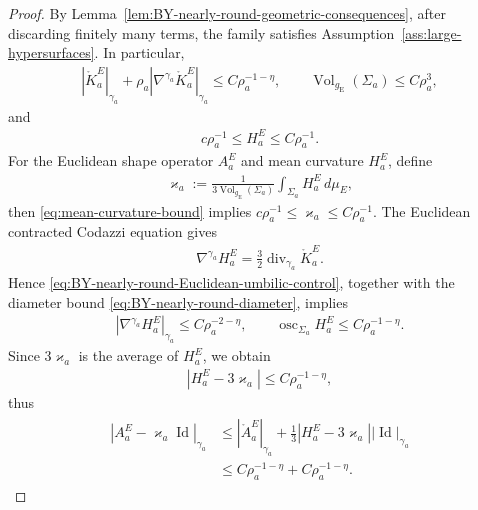 \documentclass[10pt,a4paper]{amsart}
\newcommand{\gE}{g_{\mathrm{E}}}
\newcommand{\Vol}{\operatorname{Vol}}
\newcommand{\Id}{\operatorname{Id}}
\begin{document}
	
	\begin{proof}
		By Lemma~\ref{lem:BY-nearly-round-geometric-consequences}, after
		discarding finitely many terms, the family satisfies Assumption~\ref{ass:large-hypersurfaces}. In particular,
		\begin{align}
			\label{eq:BY-nearly-round-Euclidean-umbilic-control}
			\left|\mathring K_a^E\right|_{\gamma_a}
			+
			\rho_a
			\left|\nabla^{\gamma_a}\mathring K_a^E\right|_{\gamma_a}
			\leq
			C\rho_a^{-1-\eta},
			\qquad
			\Vol_{\gE}(\Sigma_a)\leq C\rho_a^3,
		\end{align}
		and
		\begin{align}
			c\rho_a^{-1}\leq H_a^E\leq C\rho_a^{-1}.
		\end{align}
		For the Euclidean shape operator $A_a^E$ and mean curvature $H^E_a$, define
		\begin{align*}
			\varkappa_a
			:=
			\frac{1}{3\Vol_{\gE}(\Sigma_a)}
			\int_{\Sigma_a}H_a^E\,d\mu_E,
		\end{align*}
		then \eqref{eq:mean-curvature-bound} implies $c\rho_a^{-1}\leq \varkappa_a\leq C\rho_a^{-1}$. The Euclidean contracted Codazzi equation gives
		\begin{align*}
			\nabla^{\gamma_a}H_a^E
			=
			\frac32\operatorname{div}_{\gamma_a}\mathring K_a^E .
		\end{align*}
		Hence \eqref{eq:BY-nearly-round-Euclidean-umbilic-control}, together
		with the diameter bound \eqref{eq:BY-nearly-round-diameter}, implies
		\begin{align*}
			\left|\nabla^{\gamma_a}H_a^E\right|_{\gamma_a}
			\leq C\rho_a^{-2-\eta},
			\qquad
			\operatorname{osc}_{\Sigma_a}H_a^E
			\leq C\rho_a^{-1-\eta}.
		\end{align*}
		Since $3\varkappa_a$ is the average of $H_a^E$, we obtain
		\begin{align*}
			|H_a^E-3\varkappa_a|\leq C\rho_a^{-1-\eta},
		\end{align*}
		thus
		\begin{align}\label{eq:BY-nearly-round-A-close-umbilic}
			\begin{split}
				\left|A_a^E-\varkappa_a\Id\right|_{\gamma_a}
				&\leq
				\left|\mathring A_a^E\right|_{\gamma_a}
				+
				\frac13
				\left|H_a^E-3\varkappa_a\right|
				\left|\Id\right|_{\gamma_a}  \\
				&\leq
				C\rho_a^{-1-\eta}
				+
				C\rho_a^{-1-\eta}.
			\end{split}
		\end{align}
		

\end{proof}
\end{document}
